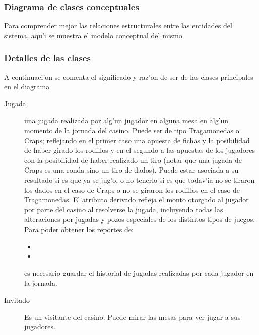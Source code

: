 \subsubsection{Diagrama de clases conceptuales}
Para comprender mejor las relaciones estructurales entre las entidades del sistema, aqu'i se muestra el modelo conceptual del mismo. 



\subsubsection{Detalles de las clases}
A continuaci'on se comenta el significado y raz'on de ser de las clases principales en el diagrama
\begin{description}
\item [Jugada] una jugada realizada por alg'un jugador en alguna mesa en alg'un momento de la jornada del casino. Puede ser de tipo Tragamonedas o Craps; reflejando en el primer caso una apuesta de fichas y la posibilidad de haber girado los rodillos y en el segundo a las apuestas de los jugadores con la posibilidad de haber realizado un tiro (notar que una jugada de Craps  es una ronda sino un tiro de dados). Puede estar asociada a su resultado si es que ya se jug'o, o no tenerlo si es que todav'ia no se tiraron los dados en el caso de Craps o no se giraron los rodillos en el caso de Tragamonedas.
El atributo derivado  refleja el monto otorgado al jugador por parte del casino al resolverse la jugada, incluyendo todas las alteraciones por jugadas y pozos especiales de los distintos tipos de juegos.
Para poder obtener los reportes de:
\begin{itemize}
    \item {} 
    \item {} 
\end{itemize}
es necesario guardar el historial de jugadas realizadas por cada jugador en la jornada.

\item [Invitado] Es un visitante del casino. Puede mirar las mesas para ver jugar a sus jugadores.


\end{description}
